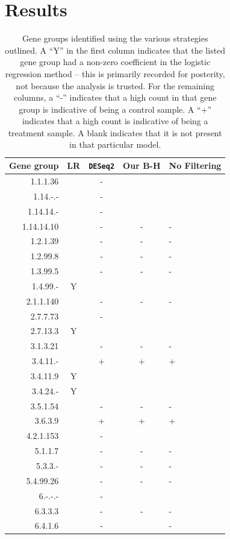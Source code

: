 \documentclass{article}
\begin{document}
\section{Results}
\begin{table}[!h]
\begin{center}
\begin{tabular}{r|cccl}
Gene group & LR & \texttt{DESeq2} & Our B-H & No Filtering\\
\hline
1.1.1.36 & & - & & \\
1.14.-.-   & & - & &\\
1.14.14.- & & - & & \\
1.14.14.10& & - & -&- \\
1.2.1.39& & - & -& -\\
1.2.99.8& & - & -& -\\
1.3.99.5& & - & -& -\\
1.4.99.-  & Y \\
2.1.1.140& & - &- &- \\
2.7.7.73& & - & & \\
2.7.13.3 & Y \\
3.1.3.21& & - & -& -\\
3.4.11.-& & + & +& +\\
3.4.11.9 & Y \\
3.4.24.-  & Y\\
3.5.1.54& & - & -& -\\
3.6.3.9& & + &+& +\\
4.2.1.153& & - & & \\
5.1.1.7& & - & -& -\\
5.3.3.-& & - &- & -\\
5.4.99.26& & - & -& -\\
6.-.-.-& & - & & \\
6.3.3.3& & - &- &- \\
6.4.1.6& & - & &- \\
\end{tabular}
\caption{\label{tbl:groups}Gene groups identified using the various strategies outlined. A ``Y'' in the first column
indicates that the listed gene group had a non-zero coefficient in the logistic regression method -- this is primarily
recorded for posterity, not because the analysis is trusted. For the remaining columns, a ``-'' indicates that
a high count in that gene group is indicative of being a control sample. A ``+'' indicates that a high count is indicative
of being a treatment sample. A blank indicates that it is not present in that particular model.}
\end{center}
\end{table}
\end{document}

